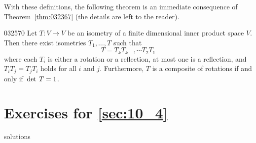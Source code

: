 With these definitions, the following theorem is an immediate consequence of Theorem~\ref{thm:032367} (the details are left to the reader).

\begin{theorem}{}{032570}
Let $T : V \to V$ be an isometry of a finite dimensional inner product space $V$. Then there exist isometries $T_{1}, \dots, T$ such that
\begin{equation*}
T = T_k T_{k - 1} \cdots T_2 T_1
\end{equation*}
where each $T_{i}$ is either a rotation or a reflection, at most one is a reflection, and $T_{i}T_{j} = T_{j}T_{i}$ holds for all $i$ and $j$. Furthermore, $T$ is a composite of rotations if and only if $\thinspace\operatorname{det\medspace} T = 1$.
\end{theorem}

\section*{Exercises for \ref{sec:10_4}}

\begin{Filesave}{solutions}
\end{Filesave}

